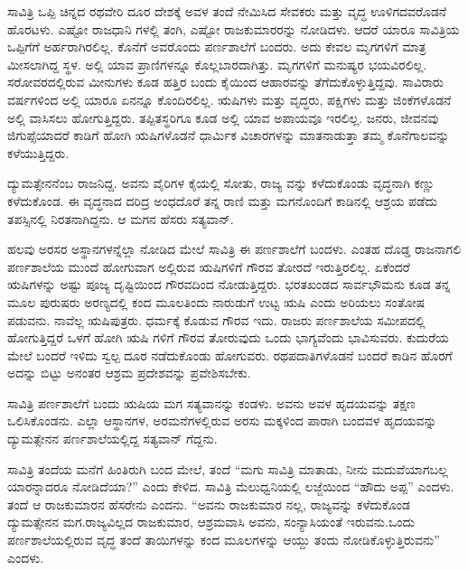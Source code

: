 ಸಾವಿತ್ರಿ ಒಪ್ಪಿ ಚಿನ್ನದ ರಥವೇರಿ ದೂರ ದೇಶಕ್ಕೆ ಅವಳ ತಂದೆ ನೇಮಿಸಿದ ಸೇವಕರು ಮತ್ತು ವೃದ್ಧ ಊಳಿಗದವರೊಡನೆ ಹೊರಟಳು. ಎಷ್ಟೋ ರಾಜಧಾನಿ ಗಳಲ್ಲಿ ತಂಗಿ, ಎಷ್ಟೋ ರಾಜಕುಮಾರರನ್ನು ನೋಡಿದಳು. ಆದರೆ ಯಾರೂ ಸಾವಿತ್ರಿಯ ಒಪ್ಪಿಗೆಗೆ ಅರ್ಹರಾಗಿರಲಿಲ್ಲ. ಕೊನೆಗೆ ಅವರೊಂದು ಪರ್ಣಶಾಲೆಗೆ ಬಂದರು. ಅದು ಕೇವಲ ಮೃಗಗಳಿಗೆ ಮಾತ್ರ ಮೀಸಲಾಗಿದ್ದ ಸ್ಥಳ. ಅಲ್ಲಿ ಯಾವ ಪ್ರಾಣಿಗಳನ್ನೂ ಕೊಲ್ಲಬಾರದಾಗಿತ್ತು. ಮೃಗಗಳಿಗೆ ಮನುಷ್ಯರ ಭಯವಿರಲಿಲ್ಲ. ಸರೋವರದಲ್ಲಿರುವ ಮೀನುಗಳು ಕೂಡ ಹತ್ತಿರ ಬಂದು ಕೈಯಿಂದ ಆಹಾರವನ್ನು ತೆಗೆದುಕೊಳ್ಳುತ್ತಿದ್ದವು. ಸಾವಿರಾರು ವರ್ಷಗಳಿಂದ ಅಲ್ಲಿ ಯಾರೂ ಏನನ್ನೂ ಕೊಂದಿರಲಿಲ್ಲ. ಋಷಿಗಳು ಮತ್ತು ವೃದ್ಧರು, ಪಕ್ಷಿಗಳು ಮತ್ತು ಜಿಂಕೆಗಳೊಡನೆ ಅಲ್ಲಿ ವಾಸಿಸಲು ಹೋಗುತ್ತಿದ್ದರು. ತಪ್ಪಿತಸ್ಥರಿಗೂ ಕೂಡ ಅಲ್ಲಿ ಯಾವ ಅಪಾಯವೂ ಇರಲಿಲ್ಲ. ಜನರು, ಜೀವನವು ಜಿಗುಪ್ಸೆಯಾದರೆ ಕಾಡಿಗೆ ಹೋಗಿ ಋಷಿಗಳೊಡನೆ ಧಾರ್ಮಿಕ ವಿಚಾರಗಳನ್ನು ಮಾತನಾಡುತ್ತಾ ತಮ್ಮ ಕೊನೆಗಾಲವನ್ನು ಕಳೆಯುತ್ತಿದ್ದರು.

ದ್ಯುಮತ್ಸೇನನೆಂಬ ರಾಜನಿದ್ದ. ಅವನು ವೈರಿಗಳ ಕೈಯಲ್ಲಿ ಸೋತು, ರಾಜ್ಯ ವನ್ನು ಕಳೆದುಕೊಂಡು ವೃದ್ಧನಾಗಿ ಕಣ್ಣು ಕಳೆದುಕೊಂಡ. ಈ ವೃದ್ಧನಾದ ದರಿದ್ರ ಅಂಧದೊರೆ ತನ್ನ ರಾಣಿ ಮತ್ತು ಮಗನೊಂದಿಗೆ ಕಾಡಿನಲ್ಲಿ ಆಶ್ರಯ ಪಡೆದು ತಪಸ್ಸಿನಲ್ಲಿ ನಿರತನಾಗಿದ್ದನು. ಆ ಮಗನ ಹೆಸರು ಸತ್ಯವಾನ್​.

ಹಲವು ಅರಸರ ಅಸ್ಥಾನಗಳನ್ನೆಲ್ಲಾ ನೋಡಿದ ಮೇಲೆ ಸಾವಿತ್ರಿ ಈ ಪರ್ಣಶಾಲೆಗೆ ಬಂದಳು. ಎಂತಹ ದೊಡ್ಡ ರಾಜನಾಗಲಿ ಪರ್ಣಶಾಲೆಯ ಮುಂದೆ ಹೋಗುವಾಗ ಅಲ್ಲಿರುವ ಋಷಿಗಳಿಗೆ ಗೌರವ ತೋರದೆ ಇರುತ್ತಿರಲಿಲ್ಲ. ಏಕೆಂದರೆ ಋಷಿಗಳನ್ನು ಅಷ್ಟು ಪೂಜ್ಯ ದೃಷ್ಟಿಯಿಂದ ಗೌರವದಿಂದ ನೋಡುತ್ತಿದ್ದರು. ಭರತಖಂಡದ ಸಾರ್ವಭೌಮನು ಕೂಡ ತನ್ನ ಮೂಲ ಪುರುಷರು ಅರಣ್ಯದಲ್ಲಿ ಕಂದ ಮೂಲತಿಂದು ನಾರುಡುಗೆ ಉಟ್ಟ ಋಷಿ ಎಂದು ಅರಿಯಲು ಸಂತೋಷ ಪಡುವನು. ನಾವೆಲ್ಲ ಋಷಿಪುತ್ರರು. ಧರ್ಮಕ್ಕೆ ಕೊಡುವ ಗೌರವ ಇದು. ರಾಜರು ಪರ್ಣಶಾಲೆಯ ಸಮೀಪದಲ್ಲಿ ಹೋಗುತ್ತಿದ್ದರೆ ಒಳಗೆ ಹೋಗಿ ಋಷಿ ಗಳಿಗೆ ಗೌರವ ತೋರುವುದು ಒಂದು ಭಾಗ್ಯವೆಂದು ಭಾವಿಸುವರು. ಕುದುರೆಯ ಮೇಲೆ ಬಂದರೆ ಇಳಿದು ಸ್ವಲ್ಪ ದೂರ ನಡೆದುಕೊಂಡು ಹೋಗುವರು. ರಥಪದಾತಿಗಳೊಡನೆ ಬಂದರೆ ಕಾಡಿನ ಹೊರಗೆ ಅದನ್ನು ಬಿಟ್ಟು ಅನಂತರ ಆಶ್ರಮ ಪ್ರದೇಶವನ್ನು ಪ್ರವೇಶಿಸಬೇಕು.

ಸಾವಿತ್ರಿ ಪರ್ಣಶಾಲೆಗೆ ಬಂದು ಋಷಿಯ ಮಗ ಸತ್ಯವಾನನ್ನು ಕಂಡಳು. ಅವನು ಅವಳ ಹೃದಯವನ್ನು ತಕ್ಷಣ ಒಲಿಸಿಕೊಂಡನು. ಎಲ್ಲಾ ಆಸ್ಥಾನಗಳ, ಅರಮನೆಗಳಲ್ಲಿರುವ ಅರಸು ಮಕ್ಕಳಿಂದ ಪಾರಾಗಿ ಬಂದವಳ ಹೃದಯವನ್ನು ದ್ಯುಮತ್ಸೇನನ ಪರ್ಣಶಾಲೆಯಲ್ಲಿದ್ದ ಸತ್ಯವಾನ್​ ಗೆದ್ದನು.

ಸಾವಿತ್ರಿ ತಂದೆಯ ಮನೆಗೆ ಹಿಂತಿರುಗಿ ಬಂದ ಮೇಲೆ, ತಂದೆ “ಮಗು ಸಾವಿತ್ರಿ ಮಾತಾಡು, ನೀನು ಮದುವೆಯಾಗಬಲ್ಲ ಯಾರನ್ನಾದರೂ ನೋಡಿದೆಯಾ?” ಎಂದು ಕೇಳಿದ. ಸಾವಿತ್ರಿ ಮೆಲುಧ್ವನಿಯಲ್ಲಿ ಲಜ್ಜೆಯಿಂದ “ಹೌದು ಅಪ್ಪ” ಎಂದಳು. ತಂದೆ ಆ ರಾಜಕುಮಾರನ ಹೆಸರೇನು ಎಂದನು. “ಅವನು ರಾಜಕುಮಾರ ನಲ್ಲ, ರಾಜ್ಯವನ್ನು ಕಳೆದುಕೊಂಡ ದ್ಯುಮತ್ಸೇನನ ಮಗ.ರಾಜ್ಯವಿಲ್ಲದ ರಾಜಕುಮಾರ, ಆಶ್ರಮವಾಸಿ ಅವನು, ಸಂನ್ಯಾಸಿಯಂತೆ ಇರುವನು.ಒಂದು ಪರ್ಣಶಾಲೆಯಲ್ಲಿರುವ ವೃದ್ಧ ತಂದೆ ತಾಯಿಗಳನ್ನು ಕಂದ ಮೂಲಗಳನ್ನು ಆಯ್ದು ತಂದು ನೋಡಿಕೊಳ್ಳುತ್ತಿರುವನು” ಎಂದಳು.

